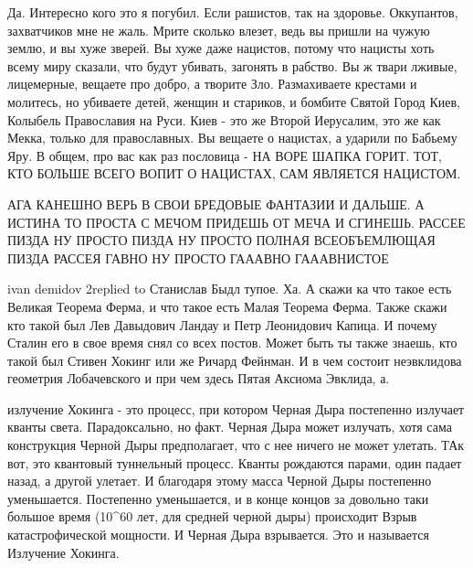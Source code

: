Да. Интересно кого это я погубил. Если рашистов, так на здоровье. Оккупантов,
захватчиков мне не жаль. Мрите сколько влезет, ведь вы пришли на чужую землю, и
вы хуже зверей. Вы хуже даже нацистов, потому что нацисты хоть всему миру
сказали, что будут убивать, загонять в рабство. Вы ж твари лживые, лицемерные,
вещаете про добро, а творите Зло. Размахиваете крестами и молитесь, но убиваете
детей, женщин и стариков, и бомбите Святой Город Киев, Колыбель Православия на
Руси. Киев - это же Второй Иерусалим, это же как Мекка, только для
православных. Вы вещаете о нацистах, а ударили по Бабьему Яру. В общем, про вас
как раз пословица - НА ВОРЕ ШАПКА ГОРИТ. ТОТ, КТО БОЛЬШЕ ВСЕГО ВОПИТ О
НАЦИСТАХ, САМ ЯВЛЯЕТСЯ НАЦИСТОМ.

АГА КАНЕШНО ВЕРЬ В СВОИ БРЕДОВЫЕ ФАНТАЗИИ И ДАЛЬШЕ. А ИСТИНА ТО ПРОСТА С МЕЧОМ
ПРИДЕШЬ ОТ МЕЧА И СГИНЕШЬ. РАССЕЕ ПИЗДА НУ ПРОСТО ПИЗДА НУ ПРОСТО ПОЛНАЯ
ВСЕОБЪЕМЛЮЩАЯ ПИЗДА РАССЕЯ ГАВНО НУ ПРОСТО ГАААВНО ГАААВНИСТОЕ

ivan demidov 2replied to Станислав
Быдл тупое. Ха. А скажи ка что такое есть Великая Теорема Ферма, и что такое
есть Малая Теорема Ферма. Также скажи кто такой был Лев Давыдович Ландау и Петр
Леонидович Капица. И почему Сталин его в свое время снял со всех постов. Может
быть ты также знаешь, кто такой был Стивен Хокинг или же Ричард Фейнман. И в
чем состоит неэвклидова геометрия Лобачевского и при чем здесь Пятая Аксиома
Эвклида, а.

излучение Хокинга - это процесс, при котором Черная Дыра постепенно излучает
кванты света. Парадоксально, но факт. Черная Дыра может излучать, хотя сама
конструкция Черной Дыры предполагает, что с нее ничего не может улетать. ТАк
вот, это квантовый туннельный процесс. Кванты рождаются парами, один падает
назад, а другой улетает. И благодаря этому масса Черной Дыры постепенно
уменьшается. Постепенно уменьшается, и в конце концов за довольно таки большое
время (10^60 лет, для средней черной дыры) происходит Взрыв катастрофической
мощности. И Черная Дыра взрывается. Это и называется Излучение Хокинга.


